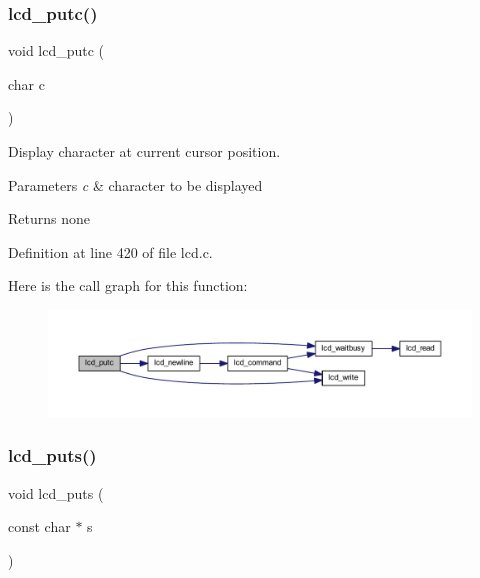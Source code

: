 \subsubsection{\texorpdfstring{lcd\_putc()}{lcd\_putc()}}
{\footnotesize\ttfamily void lcd\+\_\+putc (\begin{DoxyParamCaption}\item[{char}]{c }\end{DoxyParamCaption})}



Display character at current cursor position. 


\begin{DoxyParams}{Parameters}
{\em c} & character to be displayed\\
\hline
\end{DoxyParams}
\begin{DoxyReturn}{Returns}
none 
\end{DoxyReturn}


Definition at line 420 of file lcd.\+c.

Here is the call graph for this function\+:\nopagebreak
\begin{figure}[H]
\begin{center}
\leavevmode
\includegraphics[width=350pt]{group__pfleury__lcd_gafa7e36b95c43d603f510273ad077cbbe_cgraph}
\end{center}
\end{figure}
\mbox{\label{group__pfleury__lcd_ga8ffdfcac7638368ff04364c14984266e}} 
\subsubsection{\texorpdfstring{lcd\_puts()}{lcd\_puts()}}
{\footnotesize\ttfamily void lcd\+\_\+puts (\begin{DoxyParamCaption}\item[{const char $\ast$}]{s }\end{DoxyParamCaption})}



